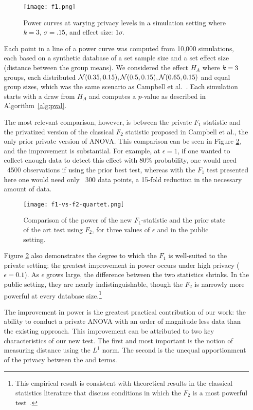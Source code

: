 \begin{figure}
\centering
\texttt{[image: f1.png]}
\caption{Power curves at varying privacy levels in a simulation setting where $k = 3$, $\sigma = .15$, and effect size: $1\sigma$.\label{Fig:f1}}
\end{figure}

Each point in a line of a power curve was computed from 10,000 simulations, each based on a synthetic database of a set sample size and a set effect size (distance between the group means).  We considered the effect $H_A$ where $k=3$ groups, each distributed $\mathcal{N}(0.35, 0.15),  \mathcal{N}(0.5,0.15), \mathcal{N}(0.65, 0.15)$ and equal group sizes, which was the same scenario as Campbell et al.~\cite{campbell2018diffprivanova}.
Each simulation starts with a draw from $H_A$ and computes a $p$-value as described in Algorithm~\ref{alg:pval}.

The most relevant comparison, however, is between the private $F_1$ statistic and the privatized version of the classical $F_2$ statistic proposed in Campbell et al., the only prior private version of ANOVA.  This comparison can be seen in Figure \ref{Fig:f1-vs-f2}, and the improvement is substantial.  For example, at $\epsilon = 1$, if one wanted to collect enough data to detect this effect with 80\% probability, one would need ~4500 observations if using the prior best test, whereas with the $F_1$ test presented here one would need only ~300 data points, a 15-fold reduction in the necessary amount of data.

\begin{figure}
\centering
\texttt{[image: f1-vs-f2-quartet.png]}
\caption{Comparison of the power of the new $F_1$-statistic and the prior state of the art test using $F_2$, for three values of $\epsilon$ and in the public setting.\label{Fig:f1-vs-f2}}
\end{figure}

Figure \ref{Fig:f1-vs-f2} also demonstrates the degree to which the $F_1$ is well-suited to the private setting; the greatest improvement in power occurs under high privacy ($\epsilon = 0.1$). As $\epsilon$ grows large, the difference between the two statistics shrinks. In the public setting, they are nearly indistinguishable, though the $F_2$ is narrowly more powerful at every database size.\footnote{This empirical result is consistent with theoretical results in the classical statistics literature that discuss conditions in which the $F_2$ is a most powerful test~\cite{cox1974theoretical}.}

The improvement in power is the greatest practical contribution of our work: the ability to conduct a private ANOVA with an order of magnitude less data than the existing approach. This improvement can be attributed to two key characteristics of our new test. The first and most important is the notion of measuring distance using the $L^1$ norm.  The second is the unequal apportionment of the privacy between the \sa and \se terms.

